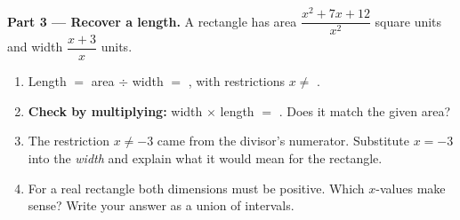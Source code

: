 \documentclass[10pt]{article}
\begin{document}
\begin{tcolorbox}[colback=white, colframe=black!40, title=\textbf{Tier E --- Extension},
    fonttitle=\bfseries, arc=1.5mm, left=3mm, right=3mm, top=2mm, bottom=2mm, breakable]
\vspace{5pt}
\textbf{Part 3 --- Recover a length.} A rectangle has area $\dfrac{x^2+7x+12}{x^2}$ square units and
width $\dfrac{x+3}{x}$ units.
\begin{enumerate}[label=(\alph*), leftmargin=1.9em, itemsep=6pt]
  \item Length $=$ area $\div$ width $=$ \blank{3.0cm}, \; with restrictions $x\neq$ \blank{2.2cm}.
  \item \textbf{Check by multiplying:} width $\times$ length $=$ \blank{3.4cm}. Does it match the
        given area? \blank{1.2cm}
  \item The restriction $x\neq-3$ came from the divisor's numerator. Substitute $x=-3$ into the
        \emph{width} and explain what it would mean for the rectangle. \writeline
  \item For a real rectangle both dimensions must be positive. Which $x$-values make sense? Write
        your answer as a union of intervals. \blank{4.4cm}
\end{enumerate}
\end{tcolorbox}
\end{document}

